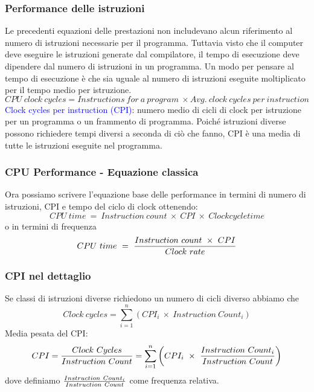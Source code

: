 \documentclass[12pt,a4paper]{article}
\begin{document}
\subsubsection{Performance delle istruzioni}
Le precedenti equazioni delle prestazioni non includevano alcun riferimento al numero di istruzioni necessarie per il programma. Tuttavia visto che il computer deve eseguire le istruzioni generate dal compilatore, il tempo di esecuzione deve dipendere dal numero di istruzioni in un programma. Un modo per pensare al tempo di esecuzione è che sia uguale al numero di istruzioni eseguite moltiplicato per il tempo medio per istruzione.
$$CPU\ clock\ cycles = Instructions\ for\ a\ program\ \times Avg.\ clock\ cycles\ per\ instruction$$
\textcolor{blue}{Clock cycles per instruction (CPI)}: numero medio di cicli di clock per istruzione per un programma o un frammento di programma. Poiché istruzioni diverse possono richiedere tempi diversi a seconda di ciò che fanno, CPI è una media di tutte le istruzioni eseguite nel programma.

\subsubsection{CPU Performance - Equazione classica}
Ora possiamo scrivere l'equazione base delle performance in termini di numero di istruzioni, CPI e tempo del ciclo di clock ottenendo:
$$CPU \ time\ = \ Instruction\ count\ \times \ CPI \ \times \ Clock cycle time$$
o in termini di frequenza
$$CPU \ time\ = \ {Instruction\ count\ \times \ CPI \over Clock\ rate}$$

\subsubsection{CPI nel dettaglio}
Se classi di istruzioni diverse richiedono un numero di cicli diverso abbiamo che $$Clock\ cycles = \sum_{i=1}^n(CPI_i\ \times \ Instruction\ Count_i)$$
Media pesata del CPI: $$CPI = {Clock\ Cycles \over Instruction\ Count} = \sum_{i=1}^n\left(CPI_i\ \times \ {Instruction\ Count_i \over Instruction\ Count}\right)$$ dove definiamo ${Instruction\ Count_i \over Instruction\ Count}$ come frequenza relativa.
\end{document}
